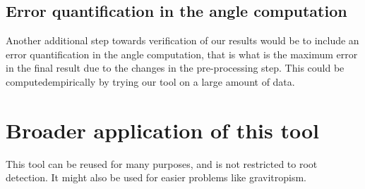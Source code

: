 %
%




\subsection{Error quantification in the angle computation}

Another additional step towards verification of our results would be to include an error quantification in the angle computation, that is what is the maximum error in the final result due to the changes in the pre-processing step. This could be computedempirically by trying our tool on a large amount of data.


\section{Broader application of this tool}

This tool can be reused for many purposes, and is not restricted to root detection.
It might also be used for easier problems like gravitropism.






